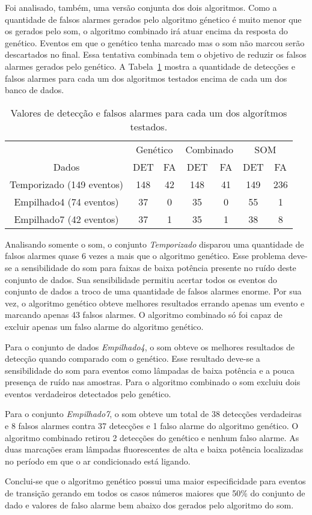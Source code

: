 Foi analisado, também, uma versão conjunta dos dois algoritmos. Como a
quantidade de falsos alarmes gerados pelo algoritmo génetico é muito
menor que os gerados pelo \acs{som}, o algoritmo combinado irá atuar encima
da resposta do genético. Eventos em que o genético tenha marcado mas o
\acs{som} não marcou serão descartados no final. Essa tentativa combinada
tem o objetivo de reduzir os falsos alarmes gerados pelo genético. A
Tabela~\ref{tab:det_fa_es_som} mostra a quantidade de detecções e
falsos alarmes para cada um dos algoritmos testados encima de cada um
dos banco de dados.

\begin{table}[!htb]
\centering
\begin{tabular}{ccccccc}
\hline
\hline
 &\multicolumn{2}{c}{Genético} & \multicolumn{2}{c}{Combinado} & \multicolumn{2}{c}{SOM}\\
Dados & DET & FA & DET & FA & DET & FA\\
\hline
Temporizado (149 eventos) & 148 & 42 & 148 & 41 & 149 & 236\\
Empilhado4 (74 eventos) & 37 & 0 & 35 & 0 & 55 & 1\\
Empilhado7 (42 eventos) & 37 & 1 & 35 & 1 & 38 & 8\\
\hline
\hline

\hline
\hline
\end{tabular}
\caption{Valores de detecção e falsos alarmes para cada um dos
algorítmos testados.}
\label{tab:det_fa_es_som}
\end{table}	

Analisando somente o \acs{som}, o conjunto \emph{Temporizado} disparou uma
quantidade de falsos alarmes quase 6 vezes a mais que o algoritmo
genético. Esse problema deve-se a sensibilidade do \acs{som} para faixas de
baixa potência presente no ruído deste conjunto de dados. Sua
sensibilidade permitiu acertar todos os eventos do conjunto de dados a
troco de uma quantidade de falsos alarmes enorme. Por sua vez, o
algoritmo genético obteve melhores resultados errando apenas um evento
e marcando apenas 43 falsos alarmes. O algoritmo combinado só foi
capaz de excluir apenas um falso alarme do algoritmo genético.

Para o conjunto de dados \emph{Empilhado4}, o \acs{som} obteve os melhores
resultados de detecção quando comparado com o genético. Esse resultado
deve-se a sensibilidade do \acs{som} para eventos como lâmpadas de baixa
potência e a pouca presença de ruído nas amostras. Para o algoritmo
combinado o \acs{som} excluiu dois eventos verdadeiros detectados pelo
genético.
	
Para o conjunto \emph{Empilhado7}, o \acs{som} obteve um total de 38 detecções
verdadeiras e 8 falsos alarmes contra 37 detecções e 1 falso alarme do
algoritmo genético. O algoritmo combinado retirou 2 detecções do
genético e nenhum falso alarme. As duas marcações eram lâmpadas
fluorescentes de alta e baixa potência localizadas no período em que o
ar condicionado está ligando.
	
Conclui-se que o algoritmo genético possui uma maior especificidade
para eventos de transição gerando em todos os casos números maiores
que 50\% do conjunto de dado e valores de falso alarme bem abaixo dos
gerados pelo algoritmo do \acs{som}.

